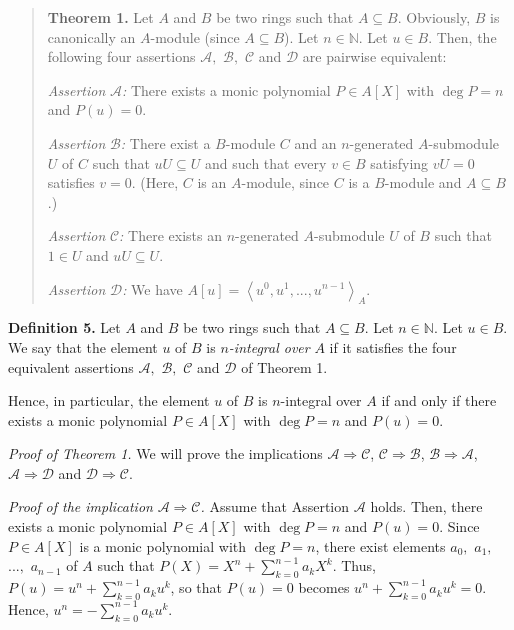 \documentclass[12pt,final,notitlepage,onecolumn]{article}%
\begin{document}
\begin{quote}
\textbf{Theorem 1.} Let $A$ and $B$ be two rings such that $A\subseteq B$.
Obviously, $B$ is canonically an $A$-module (since $A\subseteq B$). Let
$n\in\mathbb{N}$. Let $u\in B$. Then, the following four assertions
$\mathcal{A},$ $\mathcal{B},$ $\mathcal{C}$ and $\mathcal{D}$ are pairwise equivalent:

\textit{Assertion }$\mathcal{A}$\textit{:} There exists a monic polynomial
$P\in A\left[  X\right]  $ with $\deg P=n$ and $P\left(  u\right)  =0$.

\textit{Assertion }$\mathcal{B}$\textit{:} There exist a $B$-module $C$ and an
$n$-generated $A$-submodule $U$ of $C$ such that $uU\subseteq U$ and such that
every $v\in B$ satisfying $vU=0$ satisfies $v=0$. (Here, $C$ is an $A$-module,
since $C$ is a $B$-module and $A\subseteq B$.)

\textit{Assertion }$\mathcal{C}$\textit{:} There exists an $n$-generated
$A$-submodule $U$ of $B$ such that $1\in U$ and $uU\subseteq U$.

\textit{Assertion }$\mathcal{D}$\textit{:} We have $A\left[  u\right]
=\left\langle u^{0},u^{1},...,u^{n-1}\right\rangle _{A}$.
\end{quote}

\textbf{Definition 5.} Let $A$ and $B$ be two rings such that $A\subseteq B$.
Let $n\in\mathbb{N}$. Let $u\in B$. We say that the element $u$ of $B$ is
$n$\textit{-integral over }$A$ if it satisfies the four equivalent assertions
$\mathcal{A},$ $\mathcal{B},$ $\mathcal{C}$ and $\mathcal{D}$ of Theorem 1.

Hence, in particular, the element $u$ of $B$ is $n$-integral over $A$ if and
only if there exists a monic polynomial $P\in A\left[  X\right]  $ with $\deg
P=n$ and $P\left(  u\right)  =0$.

\textit{Proof of Theorem 1.} We will prove the implications $\mathcal{A}%
\Longrightarrow\mathcal{C}$, $\mathcal{C}\Longrightarrow\mathcal{B}$,
$\mathcal{B}\Longrightarrow\mathcal{A}$, $\mathcal{A}\Longrightarrow
\mathcal{D}$ and $\mathcal{D}\Longrightarrow\mathcal{C}$.

\textit{Proof of the implication }$\mathcal{A}\Longrightarrow\mathcal{C}%
$\textit{.} Assume that Assertion $\mathcal{A}$ holds. Then, there exists a
monic polynomial $P\in A\left[  X\right]  $ with $\deg P=n$ and $P\left(
u\right)  =0$. Since $P\in A\left[  X\right]  $ is a monic polynomial with
$\deg P=n$, there exist elements $a_{0},$ $a_{1},$ $...,$ $a_{n-1}$ of $A$
such that $P\left(  X\right)  =X^{n}+\sum\limits_{k=0}^{n-1}a_{k}X^{k}$. Thus,
$P\left(  u\right)  =u^{n}+\sum\limits_{k=0}^{n-1}a_{k}u^{k}$, so that
$P\left(  u\right)  =0$ becomes $u^{n}+\sum\limits_{k=0}^{n-1}a_{k}u^{k}=0$.
Hence, $u^{n}=-\sum\limits_{k=0}^{n-1}a_{k}u^{k}$.
\end{document}
